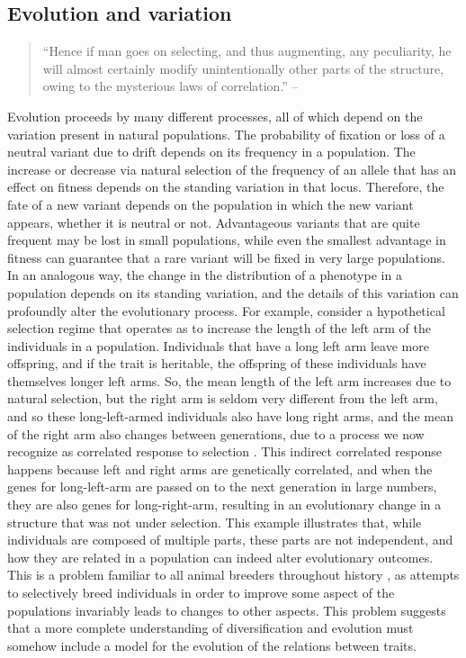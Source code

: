 \begin{refsection}

\subsection{Evolution and variation}\label{evolution-and-variation}

\begin{quote}
``Hence if man goes on selecting, and thus augmenting, any peculiarity,
he will almost certainly modify unintentionally other parts of the
structure, owing to the mysterious laws of correlation.'' --
\textbf{\textcite{Darwin1872}}
\end{quote}

Evolution proceeds by many different processes, all of which depend on
the variation present in natural populations. The probability of
fixation or loss of a neutral variant due to drift depends on its
frequency in a population. The increase or decrease via natural
selection of the frequency of an allele that has an effect on fitness
depends on the standing variation in that locus. Therefore, the fate of
a new variant depends on the population in which the new variant
appears, whether it is neutral or not. Advantageous variants that are
quite frequent may be lost in small populations, while even the smallest
advantage in fitness can guarantee that a rare variant will be fixed in
very large populations. In an analogous way, the change in the
distribution of a phenotype in a population depends on its standing
variation, and the details of this variation can profoundly alter the
evolutionary process. For example, consider a hypothetical selection
regime that operates as to increase the length of the left arm of the
individuals in a population. Individuals that have a long left arm leave
more offspring, and if the trait is heritable, the offspring of these
individuals have themselves longer left arms. So, the mean length of the
left arm increases due to natural selection, but the right arm is seldom
very different from the left arm, and so these long-left-armed
individuals also have long right arms, and the mean of the right arm
also changes between generations, due to a process we now recognize as
correlated response to selection \parencite{Lande1983-ez}. This indirect
correlated response happens because left and right arms are genetically
correlated, and when the genes for long-left-arm are passed on to the
next generation in large numbers, they are also genes for
long-right-arm, resulting in an evolutionary change in a structure that
was not under selection. This example illustrates that, while
individuals are composed of multiple parts, these parts are not
independent, and how they are related in a population can indeed alter
evolutionary outcomes. This is a problem familiar to all animal breeders
throughout history \parencite{Hazel1943-uq}, as attempts to selectively breed
individuals in order to improve some aspect of the populations
invariably leads to changes to other aspects. This problem suggests that
a more complete understanding of diversification and evolution must
somehow include a model for the evolution of the relations between
traits.


\end{refsection}
